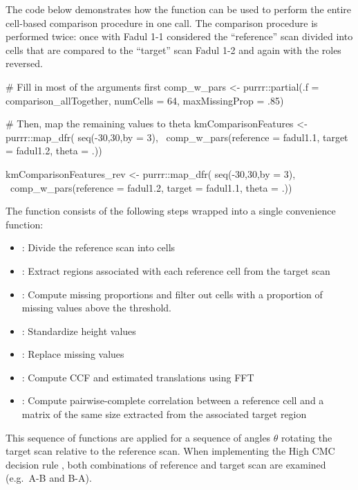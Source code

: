 The code below demonstrates how the 
function can be used to perform the entire cell-based comparison
procedure in one call. The comparison procedure is performed twice: once
with Fadul 1-1 considered the ``reference'' scan divided into cells that
are compared to the ``target'' scan Fadul 1-2 and again with the roles
reversed.

\begin{Schunk}
\begin{Sinput}
# Fill in most of the arguments first
comp_w_pars <- purrr::partial(.f = comparison_allTogether,
                              numCells = 64, maxMissingProp = .85)

# Then, map the remaining values to theta
kmComparisonFeatures <- purrr::map_dfr(
  seq(-30,30,by = 3),
  ~comp_w_pars(reference = fadul1.1, target = fadul1.2, theta = .))

kmComparisonFeatures_rev <- purrr::map_dfr(
  seq(-30,30,by = 3),
  ~comp_w_pars(reference = fadul1.2, target = fadul1.1, theta = .))
\end{Sinput}
\end{Schunk}

The  function consists of the following
steps wrapped into a single convenience function:

\begin{itemize}
\tightlist
\item
  : Divide the reference scan into cells
\item
  : Extract regions associated with
  each reference cell from the target scan
\item
  : Compute missing proportions and
  filter out cells with a proportion of missing values above the
  threshold.
\item
  : Standardize height values
\item
  : Replace missing values
\item
  : Compute CCF and estimated translations
  using FFT
\item
  : Compute pairwise-complete correlation between
  a reference cell and a matrix of the same size extracted from the
  associated target region
\end{itemize}

This sequence of functions are applied for a sequence of angles
\(\theta\) rotating the target scan relative to the reference scan. When
implementing the High CMC decision rule \citep{tong_improved_2015}, both
combinations of reference and target scan are examined (e.g.~A-B and
B-A).

